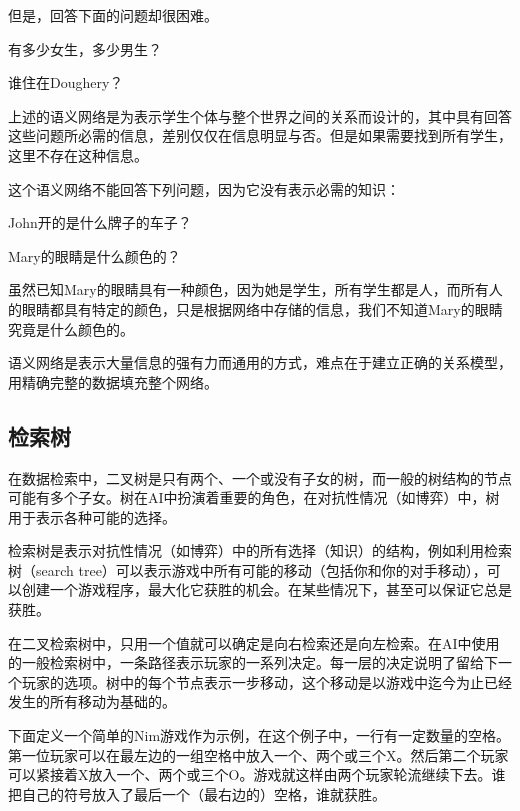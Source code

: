 但是，回答下面的问题却很困难。

\begin{compactitem}
\item 有多少女生，多少男生？
\item 谁住在Doughery？
\end{compactitem}

上述的语义网络是为表示学生个体与整个世界之间的关系而设计的，其中具有回答这些问题所必需的信息，差别仅仅在信息明显与否。但是如果需要找到所有学生，这里不存在这种信息。

这个语义网络不能回答下列问题，因为它没有表示必需的知识：


\begin{compactitem}
\item John开的是什么牌子的车子？
\item Mary的眼睛是什么颜色的？
\end{compactitem}



虽然已知Mary的眼睛具有一种颜色，因为她是学生，所有学生都是人，而所有人的眼睛都具有特定的颜色，只是根据网络中存储的信息，我们不知道Mary的眼睛究竟是什么颜色的。

语义网络是表示大量信息的强有力而通用的方式，难点在于建立正确的关系模型，用精确完整的数据填充整个网络。


\subsection{检索树}


在数据检索中，二叉树是只有两个、一个或没有子女的树，而一般的树结构的节点可能有多个子女。树在AI中扮演着重要的角色，在对抗性情况（如博弈）中，树用于表示各种可能的选择。

检索树是表示对抗性情况（如博弈）中的所有选择（知识）的结构，例如利用检索树（search tree）可以表示游戏中所有可能的移动（包括你和你的对手移动），可以创建一个游戏程序，最大化它获胜的机会。在某些情况下，甚至可以保证它总是获胜。

在二叉检索树中，只用一个值就可以确定是向右检索还是向左检索。在AI中使用的一般检索树中，一条路径表示玩家的一系列决定。每一层的决定说明了留给下一个玩家的选项。树中的每个节点表示一步移动，这个移动是以游戏中迄今为止已经发生的所有移动为基础的。

下面定义一个简单的Nim游戏作为示例，在这个例子中，一行有一定数量的空格。第一位玩家可以在最左边的一组空格中放入一个、两个或三个X。然后第二个玩家可以紧接着X放入一个、两个或三个O。游戏就这样由两个玩家轮流继续下去。谁把自己的符号放入了最后一个（最右边的）空格，谁就获胜。

